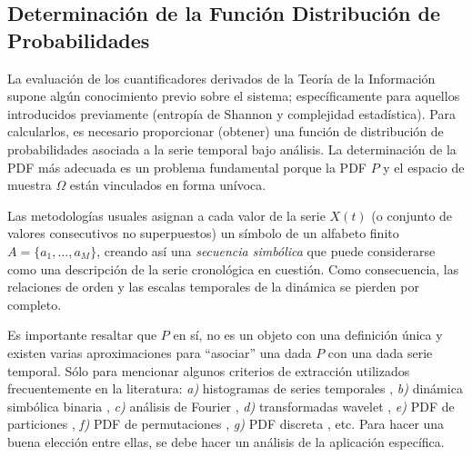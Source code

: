 \subsection{Determinación de la Función Distribución de Probabilidades}

La evaluación de los cuantificadores derivados de la Teoría de la Información supone algún conocimiento previo sobre el sistema; específicamente para aquellos introducidos previamente (entropía de Shannon y complejidad estadística).
Para calcularlos, es necesario proporcionar (obtener) una función de distribución de probabilidades asociada a la serie temporal bajo análisis.
La determinación de la PDF más adecuada es un problema fundamental porque la PDF $P$ y el espacio de muestra $\Omega$ están vinculados en forma unívoca.

Las metodologías usuales asignan a cada valor de la serie $X(t)$ (o conjunto de valores consecutivos no superpuestos) un símbolo de un alfabeto finito $A = \{a_1, \dots, a_M \}$, creando así una {\it secuencia simbólica \/} que puede considerarse como una descripción de la serie cronológica en cuestión.
Como consecuencia, las relaciones de orden y las escalas temporales de la dinámica se pierden por completo.

Es importante resaltar que $P$ en sí, no es un objeto con una definición única y existen varias aproximaciones para ``asociar'' una dada $P$ con una dada serie temporal.
Sólo para mencionar algunos criterios de extracción utilizados frecuentemente en la literatura: {\it a)\/} histogramas de series temporales \cite{Martin2004}, {\it b)\/} dinámica simbólica binaria \cite{Mischaikow1999}, {\it c)\/} análisis de Fourier \cite{Powell1979}, {\it d)\/} transformadas wavelet \cite{Blanco1998,Rosso2001}, {\it e)\/} PDF de particiones \cite{Ebeling2001}, {\it f)\/} PDF de permutaciones \cite{Bandt2002,Keller2005}, {\it g)\/} PDF discreta \cite{Amigo2007}, etc.
Para hacer una buena elección entre ellas, se debe hacer un análisis de la aplicación específica.

